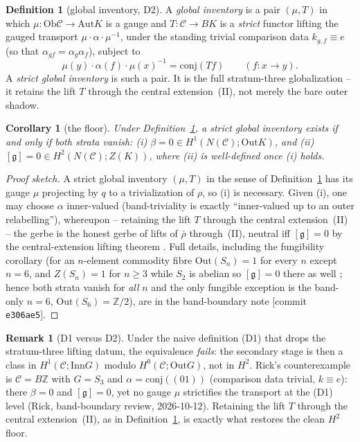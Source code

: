 \documentclass[11pt]{article}
\newtheorem{corollary}[theorem]{Corollary}
\theoremstyle{definition}
\newtheorem{definition}[theorem]{Definition}
\newtheorem{remark}[theorem]{Remark}
\newcommand{\C}{\mathcal{C}}
\newcommand{\Ob}{\mathrm{Ob}}
\newcommand{\Z}{\mathbb{Z}}
\newcommand{\Aut}{\mathrm{Aut}}
\newcommand{\Inn}{\mathrm{Inn}}
\newcommand{\Out}{\mathrm{Out}}
\newcommand{\gerbe}{\mathfrak{g}}
\begin{document}
\begin{definition}[global inventory, D2]\label{def:global}
A \emph{global inventory} is a pair $(\mu,T)$ in which $\mu\colon\Ob\C\to\Aut K$ is a gauge
and $T\colon\C\to BK$ is a \emph{strict} functor lifting the gauged transport
$\mu\cdot\alpha\cdot\mu^{-1}$, under the
standing trivial comparison data $k_{g,f}\equiv e$ (so that
$\alpha_{gf}=\alpha_g\alpha_f$), subject to
\[
\mu(y)\cdot\alpha(f)\cdot\mu(x)^{-1}=\mathrm{conj}(Tf)\qquad(f\colon x\to y).
\]
A \emph{strict global inventory} is such a pair. It is the full stratum-three globalization
-- it retains the lift $T$ through the central extension~(II), not merely the bare outer shadow.
\end{definition}

\begin{corollary}[the floor]\label{cor:floor}
Under Definition~\ref{def:global}, a strict global inventory exists if and only if both strata
vanish: \textup{(i)} $\beta=0\in H^1(N(\C);\Out K)$, and \textup{(ii)}
$[\gerbe]=0\in H^2(N(\C);Z(K))$, where \textup{(ii)} is well-defined once \textup{(i)} holds.
\end{corollary}

\begin{proof}[Proof sketch]
A strict global inventory $(\mu,T)$ in the sense of Definition~\ref{def:global} has its gauge
$\mu$ projecting by $q$ to a trivialization of $\rho$, so (i) is necessary. Given (i), one
may choose $\alpha$ inner-valued (band-triviality is exactly ``inner-valued up to an outer
relabelling''), whereupon -- retaining the lift $T$ through the central extension~(II)
-- the gerbe is the honest gerbe of lifts of $\bar\rho$ through~(II),
neutral iff $[\gerbe]=0$ by the central-extension lifting theorem \cite[IV.3]{brown}. Full details, including the fungibility
corollary (for an $n$-element commodity fibre $\Out(S_n)=1$ for every $n$ except $n=6$, and
$Z(S_n)=1$ for $n\ge3$ while $S_2$ is abelian so $[\gerbe]=0$ there as well
\cite[Thms 7.5--7.7]{rotman}; hence both strata vanish for \emph{all} $n$ and the only
fungible exception is the band-only $n=6$, $\Out(S_6)=\Z/2$), are in the band-boundary note
\textup{[commit \texttt{e306ae5}]}.
\end{proof}

\begin{remark}[D1 versus D2]\label{rem:d1}
Under the naive definition \textup{(D1)} that drops the stratum-three lifting datum, the
equivalence \emph{fails}: the secondary stage is then a class in $H^1(\C;\Inn G)$ modulo
$H^0(\C;\Out G)$, not in $H^2$. Rick's counterexample is $\C=B\Z$ with $G=S_3$ and
$\alpha=\mathrm{conj}((01))$ (comparison data trivial, $k\equiv e$): there $\beta=0$ and
$[\gerbe]=0$, yet no gauge $\mu$ strictifies the transport at the \textup{(D1)} level (Rick,
band-boundary review, 2026-10-12). Retaining the lift $T$ through the central extension~(II), as in
Definition~\ref{def:global}, is exactly what restores the clean $H^2$ floor.
\end{remark}
\end{document}
